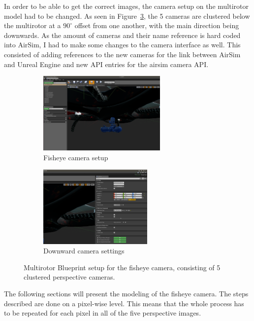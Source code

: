 In order to be able to get the correct images, the camera setup on the multirotor model had to be changed. As seen in Figure~\ref{fig:new_Blueprint_multirotor}, the 5 cameras are clustered below the multirotor at a $90^\circ$ offset from one another, with the main direction being downwards. As the amount of cameras and their name reference is hard coded into AirSim, I had to make some changes to the camera interface as well. This consisted of adding references to the new cameras for the link between AirSim and Unreal Engine and new API entries for the airsim camera API.

\begin{figure}[!htb]
    \centering
    \begin{subfigure}{0.45\linewidth}
        \centering
        \includegraphics[height=4cm]{rapport/fig/Simulator/camera_setup.png}
        \caption{Fisheye camera setup}
        \label{fig:new_Blueprint_cameras}
    \end{subfigure}
    \begin{subfigure}{0.45\linewidth}
        \centering
        \includegraphics[height=4cm]{rapport/fig/Simulator/camera_setting.png}
        \caption{Downward camera settings}
        \label{fig:new_Blueprint_nodes}
    \end{subfigure}
    \caption{Multirotor Blueprint setup for the fisheye camera, consisting of 5 clustered perspective cameras.}
    \label{fig:new_Blueprint_multirotor}
\end{figure}

The following sections will present the modeling of the fisheye camera. The steps described are done on a pixel-wise level. This means that the whole process has to be repeated for each pixel in all of the five perspective images.

